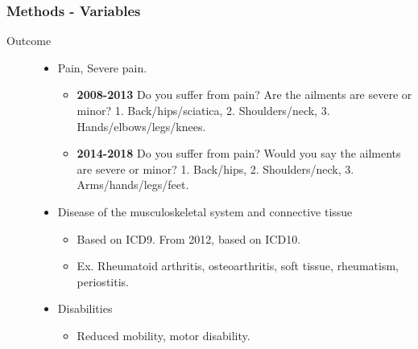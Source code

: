 \documentclass[dvipdfmx]{beamer}\usepackage[]{graphicx}\usepackage[]{color}
\begin{document}
\begin{frame}
	\frametitle{Methods - Variables}
	\begin{description}
		\item[Outcome] \mbox{}\par
			\begin{itemize} 
				\item Pain, Severe pain.
					\begin{itemize}
						\item \textbf{2008-2013} Do you suffer from pain? Are the ailments are severe or minor? 1. Back/hips/sciatica, 2. Shoulders/neck, 3. Hands/elbows/legs/knees.
						\item \textbf{2014-2018} Do you suffer from pain? Would you say the ailments are severe or minor? 1. Back/hips, 2. Shoulders/neck, 3. Arms/hands/legs/feet.
					\end{itemize} 
				\item Disease of the musculoskeletal system and connective tissue
					\begin{itemize}
						\item Based on ICD9. From 2012, based on ICD10. 
						\item Ex. Rheumatoid arthritis, osteoarthritis, soft tissue, rheumatism, periostitis.
					\end{itemize} 
				\item Disabilities
					\begin{itemize}
						\item Reduced mobility, motor disability. 
					\end{itemize}
			\end{itemize} 
	\end{description}

\end{frame}
\end{document}
